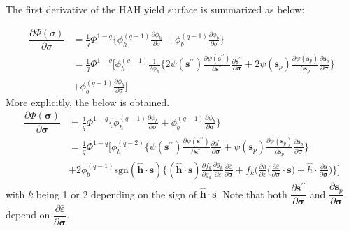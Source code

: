 \documentclass[12pt]{amsart}
\begin{document}
The first derivative of the HAH yield surface is summarized as below:

\begin{equation}
  \label{eq:hah_yieldsurface_derivative}
  \begin{split}
    \dfrac{\partial\Phi(\sigma)}{\partial\sigma}&=\frac{1}{q}\Phi^{1-q}\bigg\{\phi_h^{(q-1)}\frac{\partial\phi_h}{\partial\sigma} + \phi_b^{(q-1)}\frac{\partial\phi_b}{\partial\sigma}\bigg\}\\
    &=\frac{1}{q}\Phi^{1-q}\bigg[\phi_h^{(q-1)}\frac{1}{2\phi_h}\bigg\{ 2\psi(\mathbf{s}^{\prime\prime})\frac{\partial{\psi(\mathbf{s}^{\prime\prime})}}{\partial{\mathbf{s}^{\prime\prime}}}  \frac{\partial\mathbf{s}^{\prime\prime}}{\partial \mathbf{\sigma}}+ 2\psi(\mathbf{s}_p) \frac{\partial{\psi(\mathbf{s}_p)}}{\partial{\mathbf{s}_p}} \frac{\partial{\mathbf{s}_p}}{\partial{\mathbf{\sigma}}}\bigg\} \\
    &+ \phi_b^{(q-1)}\frac{\partial\phi_b}{\partial\sigma}\bigg]
  \end{split}
\end{equation}
More explicitly, the below is obtained.
\begin{equation}
  \label{eq:hah_yieldsurface_derivative_aux}
  \begin{split}
    \dfrac{\partial\Phi(\mathbf{\sigma})}{\partial\mathbf{\sigma}}&=\frac{1}{q}\Phi^{1-q}\bigg\{\phi_h^{(q-1)}\frac{\partial\phi_h}{\partial\mathbf{\sigma}}+\phi_b^{(q-1)}\frac{\partial\phi_b}{\partial\mathbf{\sigma}}\bigg\}\\
    &=\frac{1}{q}\Phi^{1-q}\bigg[\phi_h^{(q-2)}\bigg\{\psi(\mathbf{s}^{\prime\prime})\frac{\partial{\psi(\mathbf{s}^{\prime\prime})}}{\partial{\mathbf{s}^{\prime\prime}}}\frac{\partial\mathbf{s}^{\prime\prime}}{\partial \mathbf{\sigma}}+\psi(\mathbf{s}_p)\frac{\partial{\psi(\mathbf{s}_p)}}{\partial{\mathbf{s}_p}}\frac{\partial{\mathbf{s}_p}}{\partial{\mathbf{\sigma}}}\bigg\}\\
    &+2\phi_b^{(q-1)}\text{sgn}(\hat{\mathbf{h}}\cdot\mathbf{s})\bigg\{(\hat{\mathbf{h}}\cdot\mathbf{s})
    \frac{\partial f_k}{\partial g_k} \frac{\partial g_k}{\partial\bar{\varepsilon}}
    \frac{\partial\bar{\varepsilon}}{\partial\mathbf{\sigma}}+f_k\Bigg(\frac{\partial\hat{h}}{\partial\bar{\varepsilon}}\bigg(\frac{\partial\bar{\varepsilon}}{\partial\mathbf{\sigma}}\cdot\mathbf{s}\bigg)+\hat{h}\cdot\frac{\partial\mathbf{s}}{\partial \mathbf{\sigma}}
      \Bigg)\bigg\} \bigg]
  \end{split}
\end{equation}
with $k$ being 1 or 2 depending on the sign of $\hat{\mathbf{h}}\cdot\mathbf{s}$.
Note that both $\dfrac{\partial\mathbf{s}^{\prime\prime}}{\partial\mathbf{\sigma}}$ and $\dfrac{\partial\mathbf{s}_p}{\partial\mathbf{\sigma}}$ depend on $\dfrac{\partial\bar{\varepsilon}}{\partial\mathbf{\sigma}}$.
\end{document}
